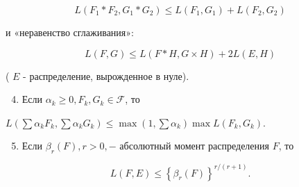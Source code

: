 \documentclass[10pt]{article}
\begin{document}
\[

L\left(F_{1} * F_{2}, G_{1} * G_{2}\right) \leqslant L\left(F_{1}, G_{1}\right)+L\left(F_{2}, G_{2}\right)

\]



и «неравенство сглаживания»:



\[

L(F, G) \leqslant L(F * H, G \times H)+2 L(E, H)

\]



( $E$ - распределение, вырожденное в нуле).



\begin{enumerate}

  \setcounter{enumi}{3}

  \item Если $\alpha_{k} \geqslant 0, F_{k}, G_{k} \in \mathscr{F}$, то

\end{enumerate}



$L\left(\sum \alpha_{k} F_{k}, \sum \alpha_{k} G_{k}\right) \leqslant \max \left(1, \sum \alpha_{k}\right) \max L\left(F_{k}, G_{k}\right)$.



\begin{enumerate}

  \setcounter{enumi}{4}

  \item Если $\beta_{r}(F), r>0,-$ абсолютный момент распределения $F$, то

\end{enumerate}



\[

L(F, E) \leqslant\left\{\beta_{r}(F)\right\}^{r /(r+1)} .

\]
\end{document}
